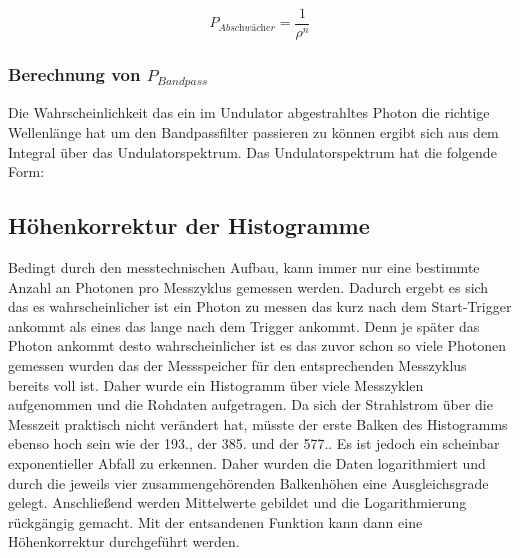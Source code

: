 \begin{equation*}
    P_{\textit{Abschwächer}} = \frac{1}{\rho^n}
\end{equation*}

\subsubsection{Berechnung von \texorpdfstring{$P_{Bandpass}$}{TEXT}}
\label{sec:PBandpass}
Die Wahrscheinlichkeit das ein im Undulator abgestrahltes Photon die richtige Wellenlänge hat um den 
Bandpassfilter passieren zu können ergibt sich aus dem Integral über das Undulatorspektrum. Das 
Undulatorspektrum hat die folgende Form:



\subsection{Höhenkorrektur der Histogramme}
\label{sec:TheorieKorrektur}
Bedingt durch den messtechnischen Aufbau, kann immer nur eine bestimmte Anzahl an Photonen pro Messzyklus
gemessen werden. Dadurch ergebt es sich das es wahrscheinlicher ist ein Photon zu messen das kurz nach 
dem Start-Trigger ankommt als eines das lange nach dem Trigger ankommt. Denn je später das Photon ankommt
desto wahrscheinlicher ist es das zuvor schon so viele Photonen gemessen wurden das der Messspeicher 
für den entsprechenden Messzyklus bereits voll ist. Daher wurde ein Histogramm über viele Messzyklen 
aufgenommen und die Rohdaten aufgetragen. Da sich der Strahlstrom über die Messzeit praktisch nicht 
verändert hat, müsste der erste Balken des Histogramms ebenso hoch sein wie der 193., der 385. und der 
577.. Es ist jedoch ein scheinbar exponentieller Abfall zu erkennen. Daher wurden die Daten logarithmiert 
und durch die jeweils vier zusammengehörenden Balkenhöhen eine Ausgleichsgrade gelegt. Anschließend werden
Mittelwerte gebildet und die Logarithmierung rückgängig gemacht. Mit der entsandenen Funktion kann dann 
eine Höhenkorrektur durchgeführt werden.  



